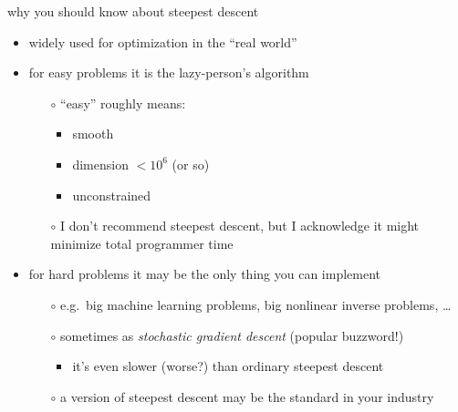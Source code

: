 \documentclass[10pt,hyperref]{beamer}
\begin{document}
\begin{frame}{why you should know about steepest descent}

\begin{itemize}
\item widely used for optimization in the ``real world''
\item for easy problems it is the lazy-person's algorithm
        \begin{itemize}
        \item[$\circ$] ``easy'' roughly means:
            \begin{itemize}
            \item smooth
            \item dimension $< 10^6$ (or so)
            \item unconstrained
            \end{itemize}
        \item[$\circ$] \alert{I don't recommend steepest descent}, but I acknowledge it might minimize total programmer time
        \end{itemize}
\item for hard problems it may be the only thing you can implement
        \begin{itemize}
        \item[$\circ$] e.g.~big machine learning problems, big nonlinear inverse problems, \dots
        \item[$\circ$] sometimes as \emph{stochastic gradient descent} (popular buzzword!)
            \begin{itemize}
            \item it's even slower (worse?) than ordinary steepest descent
            \end{itemize}
        \item[$\circ$] a version of steepest descent may be the standard in your industry
        \end{itemize}
\end{itemize}
\end{frame}
\end{document}
